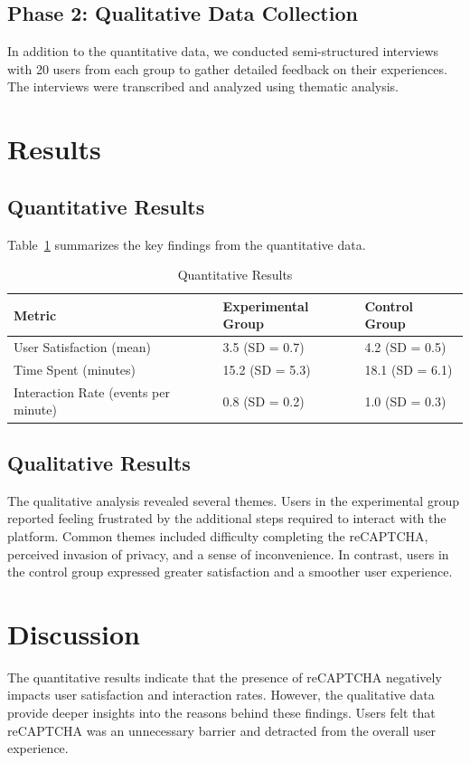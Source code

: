 \documentclass{article}
\begin{document}
\subsection{Phase 2: Qualitative Data Collection}
In addition to the quantitative data, we conducted semi-structured interviews with 20 users from each group to gather detailed feedback on their experiences. The interviews were transcribed and analyzed using thematic analysis.

\section{Results}
\subsection{Quantitative Results}
Table~\ref{tab:quantitative-results} summarizes the key findings from the quantitative data.

\begin{table}[ht]
\centering
\caption{Quantitative Results}
\label{tab:quantitative-results}
\begin{tabular}{@{}lll@{}}
\toprule
\textbf{Metric} & \textbf{Experimental Group} & \textbf{Control Group} \\
\midrule
User Satisfaction (mean) & 3.5 (SD = 0.7) & 4.2 (SD = 0.5) \\
Time Spent (minutes) & 15.2 (SD = 5.3) & 18.1 (SD = 6.1) \\
Interaction Rate (events per minute) & 0.8 (SD = 0.2) & 1.0 (SD = 0.3) \\
\bottomrule
\end{tabular}
\end{table}

\subsection{Qualitative Results}
The qualitative analysis revealed several themes. Users in the experimental group reported feeling frustrated by the additional steps required to interact with the platform. Common themes included difficulty completing the reCAPTCHA, perceived invasion of privacy, and a sense of inconvenience. In contrast, users in the control group expressed greater satisfaction and a smoother user experience.

\section{Discussion}
The quantitative results indicate that the presence of reCAPTCHA negatively impacts user satisfaction and interaction rates. However, the qualitative data provide deeper insights into the reasons behind these findings. Users felt that reCAPTCHA was an unnecessary barrier and detracted from the overall user experience.
\end{document}
